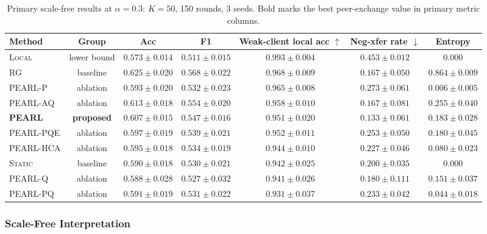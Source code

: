 \documentclass[conference]{IEEEtran}
\begin{document}
\begin{table}[t]
\centering
\caption{Primary scale-free results at $\alpha=0.3$: $K=50$, 150 rounds, 3 seeds. Bold marks the best peer-exchange value in primary metric columns.}
\label{tab:sf_results}
\renewcommand{\arraystretch}{1.18}
\setlength{\tabcolsep}{4pt}
\begin{tabular}{lcccccc}
\toprule
\textbf{Method} & \textbf{Group} & \textbf{Acc} & \textbf{F1} & \textbf{Weak-client local acc} $\uparrow$ & \textbf{Neg-xfer rate} $\downarrow$ & \textbf{Entropy} \\
\midrule
\textsc{Local}                     & lower bound & $0.573\pm0.014$ & $0.511\pm0.015$ & $0.993\pm0.004$ & $0.453\pm0.012$ & $0.000$ \\
\textsc{RG}                    & baseline    & $0.625\pm0.020$ & $0.568\pm0.022$ & $0.968\pm0.009$ & $0.167\pm0.050$ & $0.864\pm0.009$ \\
\textsc{PEARL-P}                 & ablation    & $0.593\pm0.020$ & $0.532\pm0.023$ & $0.965\pm0.008$ & $0.273\pm0.061$ & $0.006\pm0.005$ \\
\textsc{PEARL-AQ}                 & ablation    & $0.613\pm0.018$ & $0.554\pm0.020$ & $0.958\pm0.010$ & $0.167\pm0.081$ & $0.255\pm0.040$ \\
\textbf{\textsc{PEARL}}            & \textbf{proposed} & $0.607\pm0.015$ & $0.547\pm0.016$ & $\mathbf{0.951\pm0.020}$ & $\mathbf{0.133\pm0.061}$ & $0.183\pm0.028$ \\
\textsc{PEARL-PQE} & ablation    & $0.597\pm0.019$ & $0.539\pm0.021$ & $0.952\pm0.011$ & $0.253\pm0.050$ & $0.180\pm0.045$ \\
\textsc{PEARL-HCA}          & ablation    & $0.595\pm0.018$ & $0.534\pm0.019$ & $0.944\pm0.010$ & $0.227\pm0.046$ & $0.080\pm0.023$ \\
\textsc{Static}                    & baseline    & $0.590\pm0.018$ & $0.530\pm0.021$ & $0.942\pm0.025$ & $0.200\pm0.035$ & $0.000$ \\
\textsc{PEARL-Q}                   & ablation    & $0.588\pm0.028$ & $0.527\pm0.032$ & $0.941\pm0.026$ & $0.180\pm0.111$ & $0.151\pm0.037$ \\
\textsc{PEARL-PQ}              & ablation    & $0.591\pm0.019$ & $0.531\pm0.022$ & $0.931\pm0.037$ & $0.233\pm0.042$ & $0.044\pm0.018$ \\
\bottomrule
\end{tabular}
\end{table}

\subsubsection{Scale-Free Interpretation}
\label{subsubsec:sf-neg-transfer}
\end{document}

